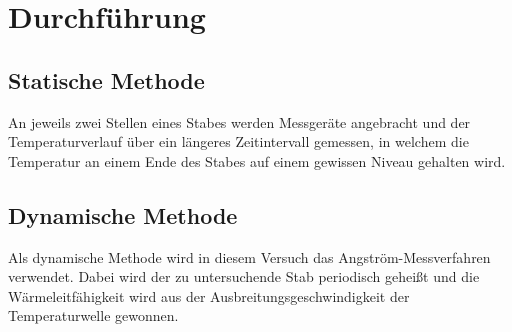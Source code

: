 \section{Durchführung}
\label{sec:Durchführung}

\subsection{Statische Methode}
    An jeweils zwei Stellen eines Stabes werden Messgeräte angebracht und der Temperaturverlauf
    über ein längeres Zeitintervall gemessen, in welchem die Temperatur an einem Ende des Stabes 
    auf einem gewissen Niveau gehalten wird.

\subsection{Dynamische Methode}
    Als dynamische Methode wird in diesem Versuch das Angström-Messverfahren verwendet. Dabei wird 
    der zu untersuchende Stab periodisch geheißt und die Wärmeleitfähigkeit wird aus der 
    Ausbreitungsgeschwindigkeit der Temperaturwelle gewonnen. 